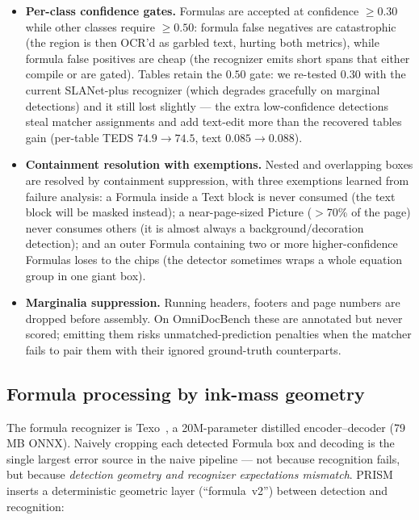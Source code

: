 \begin{itemize}
\item \textbf{Per-class confidence gates.} Formulas are accepted at confidence $\geq 0.30$ while other classes require $\geq 0.50$: formula false negatives are catastrophic (the region is then OCR'd as garbled text, hurting both metrics), while formula false positives are cheap (the recognizer emits short spans that either compile or are gated). Tables retain the $0.50$ gate: we re-tested $0.30$ with the current SLANet-plus recognizer (which degrades gracefully on marginal detections) and it still lost slightly --- the extra low-confidence detections steal matcher assignments and add text-edit more than the recovered tables gain (per-table TEDS $74.9 \rightarrow 74.5$, text $0.085 \rightarrow 0.088$).
\item \textbf{Containment resolution with exemptions.} Nested and overlapping boxes are resolved by containment suppression, with three exemptions learned from failure analysis: a Formula inside a Text block is never consumed (the text block will be masked instead); a near-page-sized Picture ($>$70\% of the page) never consumes others (it is almost always a background/decoration detection); and an outer Formula containing two or more higher-confidence Formulas loses to the chips (the detector sometimes wraps a whole equation group in one giant box).
\item \textbf{Marginalia suppression.} Running headers, footers and page numbers are dropped before assembly. On OmniDocBench these are annotated but never scored; emitting them risks unmatched-prediction penalties when the matcher fails to pair them with their ignored ground-truth counterparts.
\end{itemize}

\subsection{Formula processing by ink-mass geometry}
\label{sec:formula}

The formula recognizer is Texo~\cite{texo}, a 20M-parameter distilled encoder--decoder (79\,MB ONNX). Naively cropping each detected Formula box and decoding is the single largest error source in the naive pipeline --- not because recognition fails, but because \emph{detection geometry and recognizer expectations mismatch}. PRISM inserts a deterministic geometric layer (``formula~v2'') between detection and recognition:

